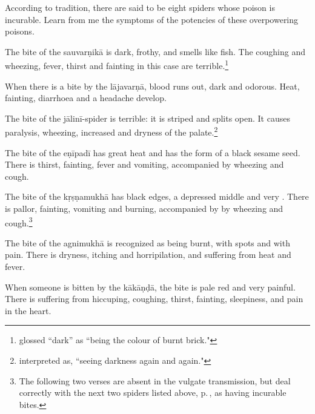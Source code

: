 \begin{translation}
\item[121]

According to tradition, there are said to be eight spiders whose poison
is incurable.  Learn from me the symptoms of the potencies of these 
overpowering poisons.

\item[122]

The bite of the \Gls{sauvarṇikā} is dark, frothy, and smells like fish.  The 
coughing and wheezing, fever, thirst and fainting in this case are 
terrible.\footnote{ glossed  “dark” as 
“being the colour of burnt brick."}

\item[123]

When there is a bite by the \Gls{lājavarṇā}, blood runs out, dark and odorous. 
Heat, fainting, diarrhoea and a headache develop.

\item[124]

The bite of the \Gls{jālinī-spider} is terrible: it is striped and splits open. It 
causes paralysis, wheezing, increased  and dryness of 
the palate.\footnote{ interpreted  
as, “seeing darkness again and again."} 

\item[125]

The bite of the \Gls{eṇīpadī} has great heat and has the form of a black sesame 
seed.  There is thirst, fainting, fever and vomiting, accompanied by wheezing 
and cough. 

\item [125 add 1]

The bite of the \Gls{kṛṣṇamukhā} has black edges, a depressed middle
and very .  There is pallor, fainting, vomiting and
burning, accompanied by by wheezing and cough.\footnote{The following
    two verses are absent in the vulgate transmission, but deal correctly
    with the next two spiders listed above,
    p.\,\pageref{sauvarnika-group}, as having incurable bites.}

\item [125 add 2]

The bite of the \Gls{agnimukhā} is recognized as being burnt, with spots and 
with pain.  There is dryness, itching and horripilation, and suffering from heat 
and fever.

\item [126]

When someone is bitten by the \Gls{kākāṇḍā}, the bite is pale red and very 
painful. There is suffering from hiccuping, coughing, thirst, fainting, sleepiness, 
and pain in the heart.


\end{translation}
